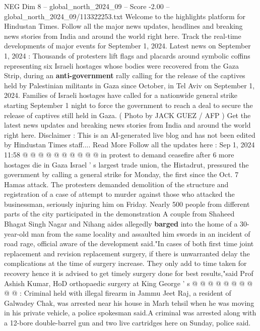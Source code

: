 \begin{textsample}{NEG Dim 8 – global\_north\_2024\_09 – Score -2.00 – global\_north\_2024\_09/113322253.txt}  \label{ex:f8_neg_148}
Welcome to the highlights platform for Hindustan Times.
Follow all the major news updates, headlines and breaking news stories from India and around the world right here.
Track the real-time developments of major events for September 1, 2024.
Latest news on September 1, 2024 : Thousands of protesters lift flags and placards around symbolic coffins representing six Israeli hostages whose bodies were recovered from the Gaza Strip, during an \textbf{anti-government} rally calling for the release of the captives held by Palestinian militants in Gaza since October, in Tel Aviv on September 1, 2024.
Families of Israeli hostages have called for a nationwide general strike starting September 1 night to force the government to reach a deal to secure the release of captives still held in Gaza. ( Photo by JACK GUEZ / AFP ) Get the latest news updates and breaking news stories from India and around the world right here.
Disclaimer : This is an AI-generated live blog and has not been edited by Hindustan Times staff....
Read More Follow all the updates here : Sep 1, 2024 11:58 @ @ @ @ @ @ @ @ @ @ in protest to demand ceasefire after 6 more hostages die in Gaza Israel ' s largest trade union, the Histadrut, pressured the government by calling a general strike for Monday, the first since the Oct. 7 Hamas attack.
The protesters demanded demolition of the structure and registration of a case of attempt to murder against those who attacked the businessman, seriously injuring him on Friday.
Nearly 500 people from different parts of the city participated in the demonstration A couple from Shaheed Bhagat Singh Nagar and Nihang aides allegedly \textbf{barged} into the home of a 30-year-old man from the same locality and assaulted him swords in an incident of road rage, official aware of the development said."In cases of both first time joint replacement and revision replacement surgery, if there is unwarranted delay the complications at the time of surgery increase.
They only add to time taken for recovery hence it is advised to get timely surgery done for best results,"said Prof Ashish Kumar, HoD orthopaedic surgery at King George ' s @ @ @ @ @ @ @ @ @ @ : Criminal held with illegal firearm in Jammu Jeet Raj, a resident of Galwadey Chak, was arrested near his house in Marh tehsil when he was moving in his private vehicle, a police spokesman said.A criminal was arrested along with a 12-bore double-barrel gun and two live cartridges here on Sunday, police said.

\end{textsample}
